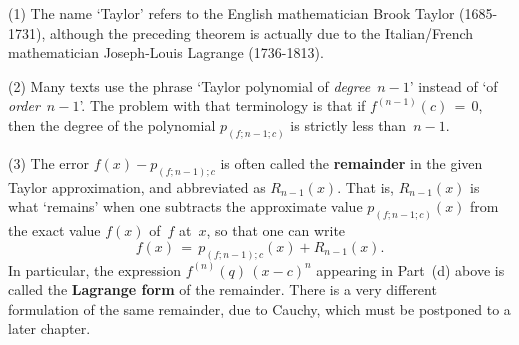 \V

\hspace*{\parindent}(1) The name `Taylor' refers to the English mathematician Brook Taylor (1685-1731),
    although the preceding theorem is actually due to the Italian/French mathematician Joseph-Louis Lagrange (1736-1813).

\V

        (2) Many texts use the phrase `Taylor polynomial of {\em degree}~$n-1$' instead of `of {\em order}~$n-1$'.
    The problem with that terminology is that if $f^{(n-1)}(c) \,=\, 0$, then the degree of the polynomial $p_{(f;n-1;c)}$ is strictly less than~$n-1$.

\V

        (3) The error $f(x) - p_{(f;n-1); c}$ is often called the {\bf remainder} in the given Taylor approximation, and abbreviated as $R_{n-1}(x)$.
    That is, $R_{n-1}(x)$ is what `remains' when one subtracts the approximate value $p_{(f;n-1;c)}(x)$ from the exact value $f(x)$ of~$f$ at~$x$,
    so that one can write
        \begin{displaymath}
        f(x) \,=\, p_{(f;n-1);c}(x) + R_{n-1}(x).
        \end{displaymath}
    In particular, the expression ${\displaystyle f^{(n)}(q)\,(x-c)^{n}}$ appearing in Part~(d) above is called the {\bf Lagrange form} of the remainder.
     There is a very different formulation of the same remainder,
    due to Cauchy, which must be postponed to a later chapter.

\VV






